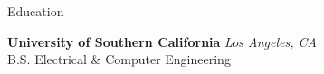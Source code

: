 \documentclass[
	11pt, %
]{tex/resume} %
\begin{document}

\begin{rSection}{Education}
	
	\textbf{University of Southern California} \hfill \textit{Los Angeles, CA} \\ 
	B.S. Electrical \& Computer Engineering \hfill \textit{}
	
\end{rSection}

\end{document}
